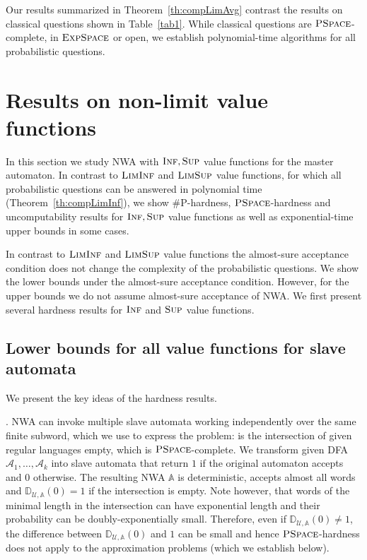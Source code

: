 \documentclass{lmcs}
\newcommand{\nestedA}{\mathbb{A}}
\newcommand{\PSPACE}{\textsc{PSpace}{}}
\newcommand{\EXPSPACE}{\textsc{ExpSpace}{}}
\newcommand{\fliminf}{\textsc{LimInf}}
\newcommand{\flimsup}{\textsc{LimSup}}
\newcommand{\fsup}{\textsc{Sup}}
\newcommand{\finf}{\textsc{Inf}}
\newcommand{\aut}{\mathcal{A}}
\newcommand{\distrib}{\mathbb{D}}
\newcommand{\calU}{\mathcal{U}}
\begin{document}
\begin{rem}\label{remark:LimAvg-classical-vs-probabilistic}
Our results summarized in Theorem~\ref{th:compLimAvg} contrast the
results on classical questions shown in Table~\ref{tab1}.
While classical questions are $\PSPACE$-complete, in $\EXPSPACE$ or open,
we establish polynomial-time algorithms for all probabilistic questions.
\end{rem}





\section{Results on non-limit value functions}\label{s:nolimit}\label{s:inf}

In this section we study NWA with $\finf, \fsup$ value functions for the master automaton.
In contrast to $\fliminf$ and $\flimsup$ value functions, for which all probabilistic questions can
be answered in polynomial time (Theorem~\ref{th:compLimInf}), we show \#P-hardness, $\PSPACE$-hardness and uncomputability results
for $\finf, \fsup$ value functions as well as exponential-time upper bounds in some cases.

In contrast to $\fliminf$ and $\flimsup$ value functions the almost-sure acceptance condition
does not change the complexity of the probabilistic questions.
We show the lower bounds under the almost-sure acceptance condition. However, for the upper bounds
we do not assume almost-sure acceptance of NWA\@. We first present several hardness results
for $\finf$ and $\fsup$ value functions.

\subsection{Lower bounds for all value functions for slave automata}

We present the key ideas of the hardness results.

\smallskip\noindent{\em $\PSPACE$-hardness}.
NWA can invoke multiple slave automata working independently over the same finite subword, which we use to express the problem:
is the intersection of given regular languages empty, which is $\PSPACE$-complete.
We transform given DFA $\aut_1, \ldots, \aut_k$ into slave automata that return $1$ if the original automaton accepts and $0$ otherwise.
The resulting NWA $\nestedA$ is deterministic, accepts almost all words and $\distrib_{\calU,\nestedA}(0)=1$ if the intersection is empty.
Note however, that words of the minimal length in the intersection can have exponential length and their probability can be doubly-exponentially small.
Therefore, even if $\distrib_{\calU,\nestedA}(0) \neq 1$, the difference between $\distrib_{\calU,\nestedA}(0)$ and $1$ can be small and hence
$\PSPACE$-hardness does not apply to the approximation problems (which we establish below).
\end{document}
